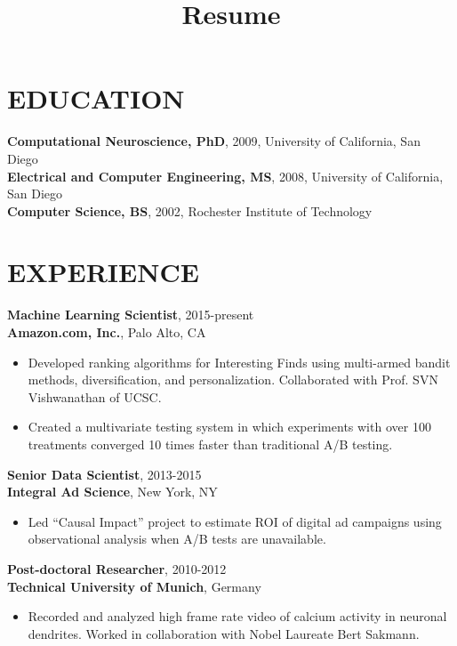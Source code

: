 \documentclass[line,10pt]{res}
\title{Resume}
\begin{document}
 
\thispagestyle{empty} %
\address{716.771.8224}
\address{daniel.n.hill@gmail.com}

\begin{resume}

\section{EDUCATION}
\vspace{0.12in}  
 \textbf{Computational Neuroscience, PhD}, 2009, University of California, San Diego \\
 \textbf{Electrical and Computer Engineering, MS}, 2008, University of California, San Diego \\
 \textbf{Computer Science, BS}, 2002, Rochester Institute of Technology

\section{EXPERIENCE}
 {\bf Machine Learning Scientist}, 2015-present \\ {\bf Amazon.com, Inc.}, Palo Alto, CA 
  \begin{itemize}
          \item[] Developed ranking algorithms for Interesting Finds using multi-armed bandit methods, diversification, and personalization.  Collaborated with Prof. SVN Vishwanathan of UCSC.  
         \item[] Created a multivariate testing system in which experiments with over 100 treatments converged 10 times faster than traditional A/B testing.  
   \end{itemize}
   
 {\bf Senior Data Scientist}, 2013-2015 \\ {\bf Integral Ad Science}, New York, NY 
  \begin{itemize}
          \item[] {\small Led ``Causal Impact'' project to estimate ROI of digital ad campaigns using observational analysis when A/B tests are unavailable.  }
        \end{itemize}
{\bf Post-doctoral Researcher}, 2010-2012 \\ {\bf Technical University of Munich}, Germany 
  \begin{itemize}
        \item[] {\small 
Recorded and analyzed high frame rate video of calcium activity in neuronal dendrites.  Worked in collaboration with Nobel Laureate Bert Sakmann.        }
  \end{itemize}



\end{resume}
\end{document}
